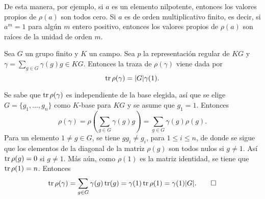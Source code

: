 De esta manera, por ejemplo, si $a$ es un elemento nilpotente, entonces los valores propios de $\rho(a)$ son todos cero. Si $a$ es de orden multiplicativo finito, es decir, si $a^m = 1$ para algún $m$ entero positivo, entonces los valores propios de $\rho(a)$ son raíces de la unidad de orden $m$. 
\begin{lema}\label{lem:traza}
Sea $G$ un grupo finito y $K$ un campo. Sea $p$ la representación regular de $KG$ y $\gamma = \sum_{g \in G}\gamma(g)g \in KG$. Entonces la traza de $\rho(\gamma)$ viene dada por
\begin{equation*}
\operatorname{tr}\rho(\gamma) = |G|\gamma(1).
\end{equation*}
\end{lema} 
\begin{proof*}
Se sabe que $\operatorname{tr}\rho(\gamma)$ es independiente de la base elegida, así que se elige $G=\{g_1, \dots, g_n \}$ como $K$-base para $KG$ y se asume que $g_1=1$.
Entonces
\begin{equation*}
\rho(\gamma) = \rho\left( \sum_{g \in G}\gamma(g)g \right) = \sum_{g \in G}\gamma(g)\rho(g) .
\end{equation*}
\indent Para un elemento $ 1 \neq g  \in G$, se tiene $gg_i \neq g_i$, para $1\leq i\leq n$, de donde se sigue que los elementos de la diagonal de la matriz $\rho(g)$ son todos nulos si $g \neq 1$. Así $\operatorname{tr}\rho(g) = 0$ si $g \neq 1$. Más aún, como $\rho(1)$ es la matriz identidad, se tiene que $\operatorname{tr}\rho(1) = n$. Entonces
\begin{equation*}
\operatorname{tr}\rho(\gamma) = \sum_{g \in G}\gamma(g)\operatorname{tr}(g) = \gamma(1)\operatorname{tr}\rho(1) = \gamma(1)|G|.\qedhere
\end{equation*} 
\end{proof*}

